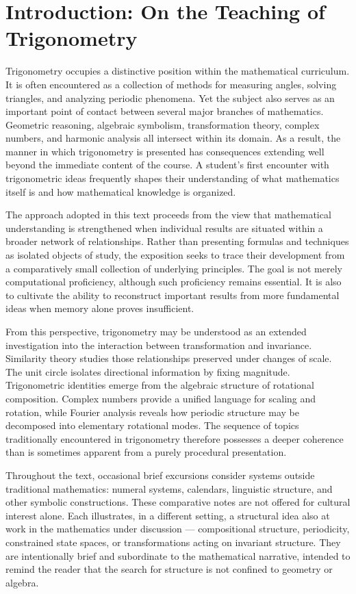 \chapter*{Introduction: On the Teaching of Trigonometry}

Trigonometry occupies a distinctive position within the mathematical curriculum. It
is often encountered as a collection of methods for measuring angles, solving
triangles, and analyzing periodic phenomena. Yet the subject also serves as an
important point of contact between several major branches of mathematics.
Geometric reasoning, algebraic symbolism, transformation theory, complex numbers,
and harmonic analysis all intersect within its domain. As a result, the manner in
which trigonometry is presented has consequences extending well beyond the
immediate content of the course. A student's first encounter with trigonometric
ideas frequently shapes their understanding of what mathematics itself is and how
mathematical knowledge is organized.

The approach adopted in this text proceeds from the view that mathematical
understanding is strengthened when individual results are situated within a
broader network of relationships. Rather than presenting formulas and techniques
as isolated objects of study, the exposition seeks to trace their development from
a comparatively small collection of underlying principles. The goal is not merely
computational proficiency, although such proficiency remains essential. It is also
to cultivate the ability to reconstruct important results from more fundamental
ideas when memory alone proves insufficient.

From this perspective, trigonometry may be understood as an extended
investigation into the interaction between transformation and invariance.
Similarity theory studies those relationships preserved under changes of scale.
The unit circle isolates directional information by fixing magnitude.
Trigonometric identities emerge from the algebraic structure of rotational
composition. Complex numbers provide a unified language for scaling and rotation,
while Fourier analysis reveals how periodic structure may be decomposed into
elementary rotational modes. The sequence of topics traditionally encountered in
trigonometry therefore possesses a deeper coherence than is sometimes apparent
from a purely procedural presentation.

Throughout the text, occasional brief excursions consider systems outside
traditional mathematics: numeral systems, calendars, linguistic structure, and
other symbolic constructions. These comparative notes are not offered for
cultural interest alone. Each illustrates, in a different setting, a structural
idea also at work in the mathematics under discussion --- compositional
structure, periodicity, constrained state spaces, or transformations acting on
invariant structure. They are intentionally brief and subordinate to the
mathematical narrative, intended to remind the reader that the search for
structure is not confined to geometry or algebra.

